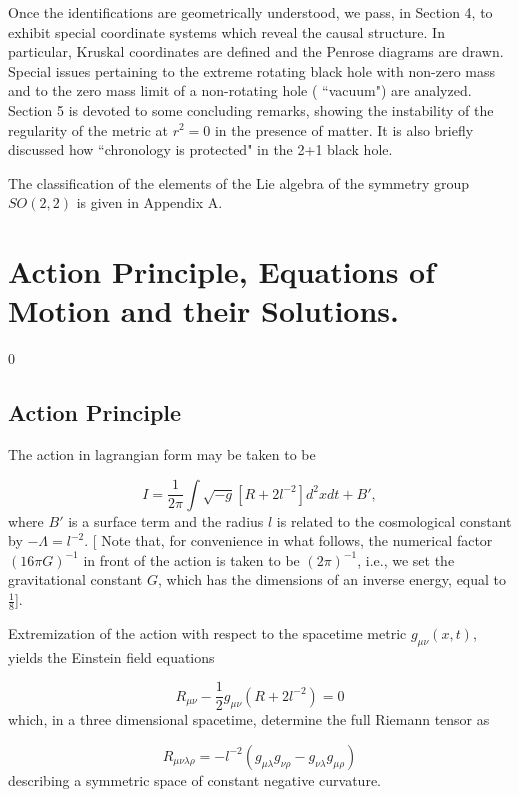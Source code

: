 \documentclass[12pt]{article}
\newcounter{c1} \newcounter{c2}
\newcommand{\bb}{\begin{equation}}
\newcommand{\ee}{\end{equation}}
\begin{document}
Once the identifications are geometrically understood, we pass,
in Section 4, to exhibit special coordinate systems which
reveal the causal structure. In particular, Kruskal coordinates are
defined and the Penrose diagrams are drawn. Special issues
pertaining to the extreme rotating black hole with non-zero mass
and to the zero mass limit of a non-rotating hole ( ``vacuum")
are analyzed. Section 5 is devoted to some concluding remarks, showing the
 instability of the regularity of the metric at $r^2 = 0$ in the presence of
 matter. It is also briefly discussed how ``chronology is protected" in
the 2+1 black hole.

The classification of the elements of the Lie algebra of the symmetry group
$SO(2,2)$ is given in Appendix A.



\section{Action Principle, Equations of Motion
\newline and their Solutions. }
\setcounter{equation} 0


\subsection{Action Principle}

The action in lagrangian form may be taken to be

\bb
I= \frac{1}{2\pi} \int \sqrt{-g} \left[ R + 2l^{-2}
\right]d^2 xdt  + B',
\label{1}
\ee
%
where $B'$ is a surface term and the radius $l$ is related to the
cosmological constant by $-\Lambda = l^{-2} $. [ Note that, for
convenience in what follows, the numerical factor $(16 \pi G)^{-1}$ in
front of
the action is taken to be $(2 \pi) ^{-1}$, i.e., we set the gravitational
 constant $G$, which has the dimensions of an inverse energy, equal to
 $\frac{1}{8}$].

Extremization of the action with respect to the spacetime metric
$g_{\mu \nu}(x,t)$, yields the Einstein field equations

\bb
R_{\mu \nu} - \frac{1}{2} g_{\mu \nu} (R + 2 l^{-2}) = 0
\label{2}
\ee
%
which, in a three dimensional spacetime, determine the full
Riemann tensor as

\bb
R_{\mu \nu \lambda \rho} = -l^{-2} (g_{\mu \lambda} g_{\nu \rho}
- g_{\nu \lambda} g_{\mu \rho})
\label{3}
\ee
%
describing a symmetric space of constant negative curvature.
\end{document}
